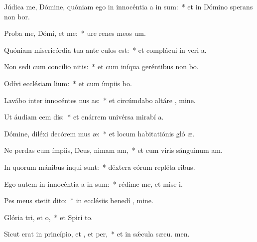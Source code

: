 \item Júdica me, Dómine, quóniam ego in innocéntia a in sum:~* et in Dómino sperans non bor.
\item Proba me, Dómi, et  me:~* ure renes meos   um.
\item Quóniam misericórdia tua ante culos  est:~* et complácui in veri a.
\item Non sedi cum concílio nitis:~* et cum iníqua geréntibus non bo.
\item Odívi ecclésiam lium:~* et cum ímpiis  bo.
\item Lavábo inter innocéntes nus as:~* et circúmdabo altáre , mine.
\item Ut áudiam cem dis:~* et enárrem univérsa mirabí a.
\item Dómine, diléxi decórem mus æ:~* et locum habitatiónis gló æ.
\item Ne perdas cum ímpiis, Deus, nimam am,~* et cum viris sánguinum  am.
\item In quorum mánibus inqui sunt:~* déxtera eórum repléta  ribus.
\item Ego autem in innocéntia a in sum:~* rédime me, et mise i.
\item Pes meus stetit  dito:~* in ecclésiis benedí , mine.
\item Glória tri, et o,~* et Spirí to.
\item Sicut erat in princípio, et , et per,~* et in sǽcula sæcu. men.
